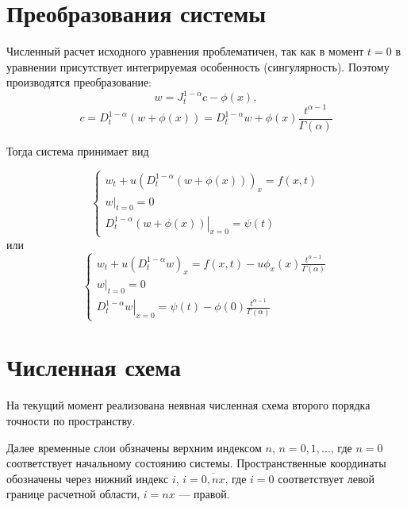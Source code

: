 \section{Преобразования системы}
Численный расчет исходного уравнения проблематичен, так как в момент $t=0$ в уравнении присутствует интегрируемая особенность (сингулярность). Поэтому производятся преобразование:
\begin{equation}
	w = J^{1-\alpha}_t c - \phi(x),
\end{equation}
\begin{equation}
	c = D^{1-\alpha}_t \left( w + \phi(x) \right)
	= D^{1-\alpha}_t w + \phi(x) \frac{t^{\alpha - 1}}{\Gamma(\alpha)}
\end{equation}


Тогда система принимает вид

\begin{equation}
	\begin{cases}
		w_t + u \left( D^{1-\alpha}_t \left( w + \phi\left(x\right) \right) \right)_x = f(x,t)\\
		\left.w\right|_{t=0} = 0\\
		\left.D^{1-\alpha}_t \left( w + \phi(x) \right) \right|_{x=0} = \psi(t)
	\end{cases}
\end{equation}
или
\begin{equation}
	\label{eq:num1}
	\begin{cases}
		w_t + u \left( D^{1-\alpha}_t w\right)_x
		= f(x,t) - u \phi_x\left(x\right)\frac{t^{\alpha - 1}}{\Gamma(\alpha)}\\
		\left.w\right|_{t=0} = 0\\
		\left.D^{1-\alpha}_t w \right|_{x=0}
		= \psi(t) - \phi(0) \frac{t^{\alpha - 1}}{\Gamma(\alpha)}
	\end{cases}
\end{equation}

\section{Численная схема}
На текущий момент реализована неявная численная схема второго порядка точности по пространству.

Далее временные слои обзначены верхним индексом $n$, $n=0,1,...$, где $n=0$ соответствует начальному состоянию системы. Пространственные координаты обозначены через нижний индекс $i$, $i=\overline{0,nx}$, где $i=0$ соответствует левой границе расчетной области, $i=nx$ --- правой.

